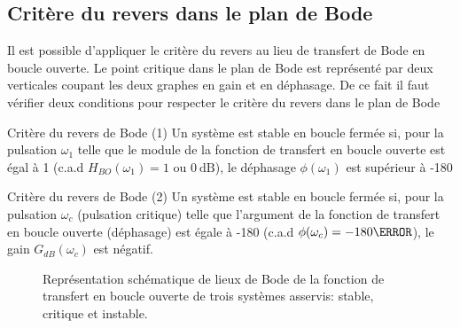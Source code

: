 \subsection{Critère du revers dans le plan de Bode
}
Il est possible d'appliquer le critère du revers au lieu de transfert de Bode
en boucle ouverte. Le point critique
dans le plan de Bode est représenté par deux verticales coupant les deux 
graphes en gain et en déphasage. De ce fait il faut vérifier deux conditions 
pour respecter le critère du revers dans le plan de Bode 
\begin{criteria}{Critère du revers de Bode (1)}
    Un système est stable en boucle fermée si, pour la pulsation 
    $\omega_{1}$ telle que le module de la fonction de transfert en boucle 
    ouverte est égal à 1 (c.a.d $H_{BO}(\omega_{1})=1$ ou $\SI{0}{\dB}$), 
    le déphasage $\phi(\omega_1)$ est supérieur à -180\degree
\end{criteria}
\begin{criteria}{Critère du revers de Bode (2)}
    Un système est stable en boucle fermée si, pour la pulsation 
    $\omega_{c}$ (pulsation critique) telle que l'argument de la fonction de 
    transfert en boucle ouverte (déphasage) est égale à -180\degree 
    (c.a.d $\phi(\omega_c)=-180\degree$), le gain $G_{dB}(\omega_c)$ est 
    négatif.
\end{criteria}
\begin{figure}[!h]
\centering
    
    \caption{Représentation schématique de lieux de Bode de la fonction 
             de transfert en boucle ouverte de trois systèmes asservis: 
             stable, critique et instable.}
\end{figure}

